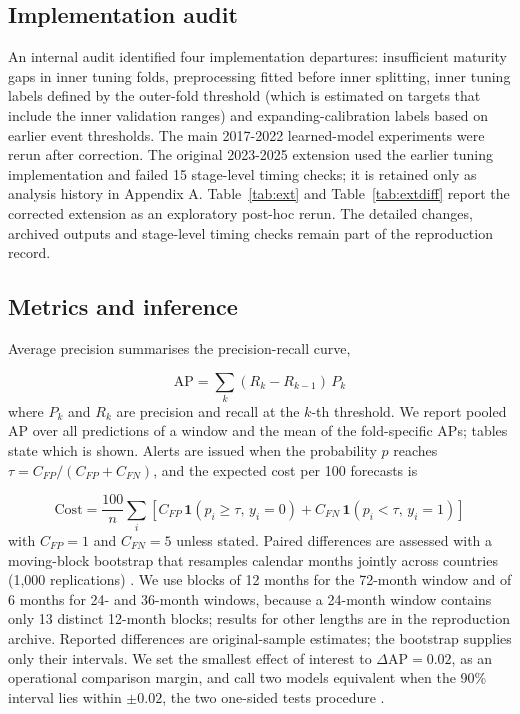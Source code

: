 \documentclass[preprint,12pt,authoryear]{elsarticle}
\begin{document}
\subsection{Implementation audit}
An internal audit identified four implementation departures: insufficient maturity gaps in inner tuning folds, preprocessing fitted before inner splitting, inner tuning labels defined by the outer-fold threshold (which is estimated on targets that include the inner validation ranges) and expanding-calibration labels based on earlier event thresholds. The main 2017-2022 learned-model experiments were rerun after correction. The original 2023-2025 extension used the earlier tuning implementation and failed 15 stage-level timing checks; it is retained only as analysis history in Appendix A. Table~\ref{tab:ext} and Table~\ref{tab:extdiff} report the corrected extension as an exploratory post-hoc rerun. The detailed changes, archived outputs and stage-level timing checks remain part of the reproduction record.

\subsection{Metrics and inference}
Average precision summarises the precision-recall curve,

\begin{equation}\label{eq:ap}
\mathrm{AP} = \sum_{k} (R_k - R_{k-1})\, P_k
\end{equation}
where $P_k$ and $R_k$ are precision and recall at the $k$-th threshold. We report pooled AP over all predictions of a window and the mean of the fold-specific APs; tables state which is shown. Alerts are issued when the probability $p$ reaches $\tau = C_{FP}/(C_{FP} + C_{FN})$, and the expected cost per 100 forecasts is

\begin{equation}\label{eq:cost}
\mathrm{Cost} = \frac{100}{n} \sum_{i} \left[ C_{FP}\, \mathbf{1}(p_i \ge \tau,\, y_i = 0) + C_{FN}\, \mathbf{1}(p_i < \tau,\, y_i = 1) \right]
\end{equation}
with $C_{FP} = 1$ and $C_{FN} = 5$ unless stated. Paired differences are assessed with a moving-block bootstrap that resamples calendar months jointly across countries (1,000 replications) \citep{kunsch1989}. We use blocks of 12 months for the 72-month window and of 6 months for 24- and 36-month windows, because a 24-month window contains only 13 distinct 12-month blocks; results for other lengths are in the reproduction archive. Reported differences are original-sample estimates; the bootstrap supplies only their intervals. We set the smallest effect of interest to $\Delta\mathrm{AP} = 0.02$, as an operational comparison margin, and call two models equivalent when the 90\% interval lies within $\pm 0.02$, the two one-sided tests procedure \citep{schuirmann1987,lakens2017}.
\end{document}
